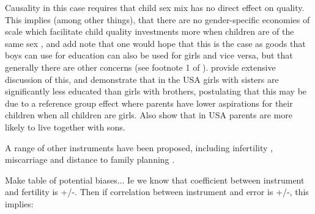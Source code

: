 Causality in this case requires that child sex mix has no direct effect on 
quality.  This implies (among other things), that there are no gender-specific 
economies of scale which facilitate child quality investments more when children
are of the same sex \citet{ButcherCase1994}, and add note that one would hope 
that this is the case as goods that boys can use for education can also be used 
for girls and vice versa, but that generally there are other concerns (see 
footnote 1 of \citet{RosenzweigZhang2009}). \citet{ButcherCase1994} provide 
extensive discussion of this, and demonstrate that in the USA girls with sisters
are significantly less educated than girls with brothers, postulating that this
may be due to a reference group effect where parents have lower aspirations for
their children when all children are girls. Also \citet{DahlMoretti2008} show
that in USA parents are more likely to live together with sons.


A range of other instruments have been proposed, including infertility
\citep{Bougmaetal2015}, miscarriage \citep{Hotzetal1997,Marlani2008,Miller2009}
and distance to family planning \citep{DangRogers2013}.

Make table of potential biases...  Ie we know that coefficient between 
instrument and fertility is +/-.  Then if correlation between instrument
and error is +/-, this implies:

